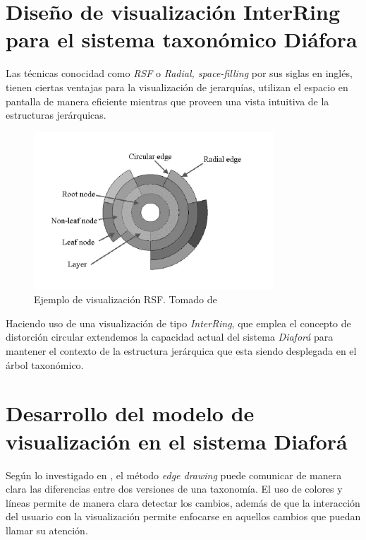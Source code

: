 \documentclass[journal]{IEEEtran}
\begin{document}
\section{Diseño de visualización InterRing para el sistema taxonómico Diáfora}
Las técnicas conocidad como \emph{RSF} o \emph{Radial, space-filling} por sus siglas en inglés,
 tienen ciertas ventajas
para la visualización de jerarquías, utilizan el espacio en pantalla de manera eficiente mientras que proveen una vista intuitiva 
de la estructuras jerárquicas.
\begin{figure}[]
  \centering
  \includegraphics[scale=0.6]{interring}
  \caption{Ejemplo de visualización RSF. Tomado  de \cite{yang_ward_rundensteiner}}
\end{figure}

Haciendo uso de una visualización de tipo \emph{InterRing}\cite{yang_ward_rundensteiner}, que emplea
el concepto de distorción circular extendemos la capacidad actual del sistema \emph{Diaforá} para mantener el contexto
de la estructura jerárquica que esta siendo desplegada en el árbol taxonómico.

\section{Desarrollo del modelo de visualización en el sistema Diaforá}
Según lo investigado en \cite{sancho_diafora}, el método \emph{edge drawing} puede comunicar de manera clara las
diferencias entre dos versiones de una taxonomía. El uso de colores y líneas permite de manera clara detectar los
cambios, además de que la interacción del usuario con la visualización permite enfocarse en aquellos cambios que 
puedan llamar su atención.
\end{document}
